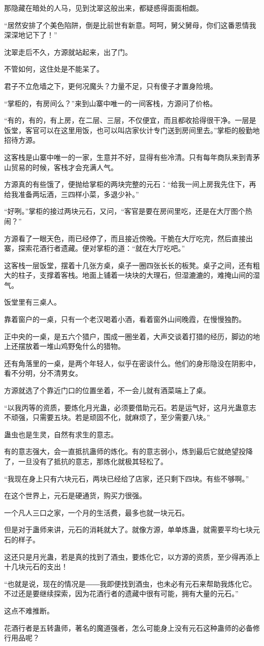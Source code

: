 \begin{this_body}
那隐藏在暗处的人马，见到沈翠这般出来，都疑惑得面面相觑。

“居然安排了个美色陷阱，倒是比前世有新意。呵呵，舅父舅母，你们这番恩情我深深地记下了！”

沈翠走后不久，方源就站起来，出了门。

不管如何，这住处是不能呆了。

君子不立危墙之下，更何况魔头？力量不足，只有傻子才置身险境。

“掌柜的，有房间么？”来到山寨中唯一的一间客栈，方源问了价格。

“有的，有的，有上房，在二层、三层，不仅便宜，而且都收拾得很干净。一层是饭堂，客官可以在这里用饭，也可以叫店家伙计专门送到房间里去。”掌柜的殷勤地招待方源。

这客栈是山寨中唯一的一家，生意并不好，显得有些冷清。只有每年商队来到青茅山贸易的时候，客栈才会充满人气。

方源真的有些饿了，便抛给掌柜的两块完整的元石：“给我一间上房我先住下，再给我准备两坛酒，三四样小菜，多退少补。”

“好咧。”掌柜的接过两块元石，又问，“客官是要在房间里吃，还是在大厅图个热闹？”

方源看了一眼天色，雨已经停了，而且接近傍晚。干脆在大厅吃完，然后直接出寨，探索花酒行者遗藏。便对掌柜的道：“就在大厅吃吧。”

这客栈一层饭堂，摆着十几张方桌，桌子一圈四张长长的板凳。桌子之间，还有粗大的柱子，支撑着客栈。地面上铺着一块块的大理石，但湿漉漉的，难掩山间的湿气。

饭堂里有三桌人。

靠着窗户的一桌，只有一个老汉喝着小酒，看着窗外山间晚霞，在慢慢独酌。

正中央的一桌，是五六个猎户，围成一圈坐着，大声交谈着打猎的经历，脚边的地上还摆放着一堆山鸡野兔什么的猎物。

还有角落里的一桌，是两个年轻人，似乎在密谈什么。他们的身形隐没在阴影中，看不分明，分不清男女。

方源就选了个靠近门口的位置坐着，不一会儿就有酒菜端上了桌。

“以我丙等的资质，要炼化月光蛊，必须要借助元石。若是运气好，这月光蛊意志不顽强，只需要五块。若是顽固不化，就麻烦了，至少需要八块。”

蛊虫也是生灵，自然有求生的意志。

有的意志强大，会一直抵抗蛊师的炼化。有的意志弱小，炼到最后它就绝望投降了，一旦没有了抵抗的意志，那炼化就极其轻松了。

“我现在身上只有六块元石，两块已经给了店家，还只剩下四块。有些不够啊。”

在这个世界上，元石是硬通货，购买力很强。

一个凡人三口之家，一个月的生活费，最多也就一块元石。

但是对于蛊师来讲，元石的消耗就大了。就像方源，单单炼蛊，就需要平均七块元石的样子。

这还只是月光蛊，若是真的找到了酒虫，要炼化它，以方源的资质，至少得再添上十几块元石的支出！

“也就是说，现在的情况是――我即便找到酒虫，也未必有元石来帮助我炼化它。不过还是要继续探索，因为花酒行者的遗藏中很有可能，拥有大量的元石。”

这点不难推断。

花酒行者是五转蛊师，著名的魔道强者，怎么可能身上没有元石这种蛊师的必备修行用品呢？

\end{this_body}

